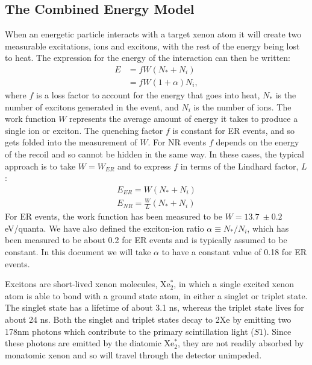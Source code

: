 \subsection{The Combined Energy Model}\label{sec:combE}
When an energetic particle interacts with a target xenon atom it will create two measurable excitations, ions and excitons, with the rest of the energy being lost to heat. The expression for the energy of the interaction can then be written:
\begin{equation}\label{eq:combe1}
\begin{split}
E&=fW(N_*+N_i)\\
&=fW(1+\alpha)N_i,
\end{split}
\end{equation}
where $f$ is a loss factor to account for the energy that goes into heat, $N_*$ is the number of excitons generated in the event, and $N_i$ is the number of ions. The work function $W$ represents the average amount of energy it takes to produce a single ion or exciton. The quenching factor $f$ is constant for ER events, and so gets folded into the measurement of $W$. For NR events $f$ depends on the energy of the recoil and so cannot be hidden in the same way. In these cases, the typical approach is to take $W=W_{ER}$ and to express $f$ in terms of the Lindhard factor, $L$\cite{lindhard}:
\begin{equation}
\begin{split}
E_{ER}=W(N_*+N_i)\\[1em]
E_{NR}=\frac{W}{L}(N_*+N_i)
\end{split}
\end{equation}
For ER events, the work function has been measured to be $W=13.7 \ \pm0.2$ eV/quanta\cite{dahl}. We have also defined the exciton-ion ratio $\alpha \equiv N_{*}/N_{i}$, which has been measured to be about 0.2\cite{doke2002,attila} for ER events and is typically assumed to be constant. In this document we will take $\alpha$ to have a constant value of 0.18 for ER events. 

Excitons are short-lived xenon molecules, Xe$_2^*$, in which a single excited xenon atom is able to bond with a ground state atom, in either a singlet or triplet state. The singlet state has a lifetime of about 3.1 ns, whereas the triplet state lives for about 24 ns\cite{pulseshape}. Both the singlet and triplet states decay to 2Xe by emitting two 178nm photons which contribute to the primary scintillation light ($S1$). Since these photons are emitted by the diatomic Xe$_2^*$, they are not readily absorbed by monatomic xenon and so will travel through the detector unimpeded. 

